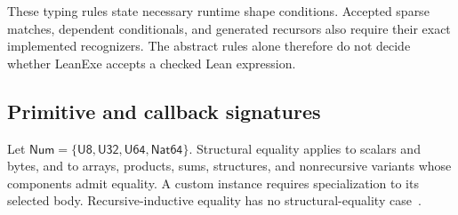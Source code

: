 \documentclass[11pt]{article}
\newcommand{\code}[1]{\texttt{\seqsplit{#1}}}
\newcommand{\ty}[1]{\mathsf{#1}}
\begin{document}
These typing rules state necessary runtime shape conditions.  Accepted sparse matches, dependent conditionals, and generated recursors also require their exact implemented recognizers.  The abstract rules alone therefore do not decide whether LeanExe accepts a checked Lean expression.

\subsection{Primitive and callback signatures}

Let $\ty{Num}=\{\ty{U8},\ty{U32},\ty{U64},\ty{Nat64}\}$.  Structural equality applies to scalars and bytes, and to arrays, products, sums, structures, and nonrecursive variants whose components admit equality.  A custom \code{BEq} instance requires specialization to its selected body.  Recursive-inductive equality has no structural-equality case~\cite{demand,extract}.
\end{document}
